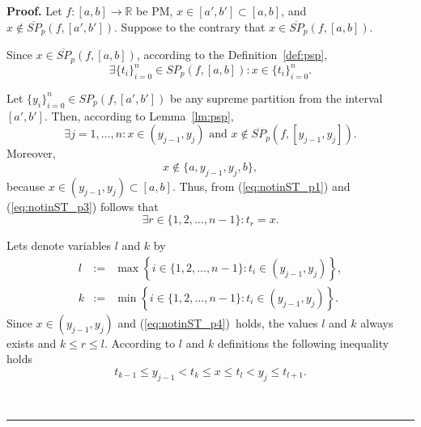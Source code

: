 \documentclass[12pt, a4paper]{article}
\newenvironment{proof}[1][Proof]{\noindent \textbf{#1.} }{\  \rule{0.5em}{0.5em}}
\numberwithin{equation}{section}
\begin{document}
\begin{proof}
  Let $f:[a,b] \rightarrow \mathbb{R}$ be PM,
  $x \in [a', b'] \subset [a,b]$, 
  and $ x \notin \overline{SP}_p(f, [a', b'])$.
  Suppose to the contrary that
  $x \in \overline{SP}_p(f, [a, b])$.
  
  Since $x \in \overline{SP}_p(f, [a, b])$,
  according to the Definition~\ref{def:psp},
  \begin{equation} \label{eq:notinST_p1} 
    \exists \{t_i\}_{i=0}^n \in SP_p(f, [a, b]): x \in \{t_i\}_{i=0}^n.
  \end{equation}     
  
  Let $\{y_i\}_{i=0}^n \in SP_p(f, [a', b'])$ be any 
  supreme partition from the interval $[a', b']$. 
  Then, according to Lemma~\ref{lm:psp}, 
  \begin{equation} \label{eq:notinST_p2} 
    \exists j=1,\dots,n: x \in (y_{j-1}, y_j) \text{ and } 
    x \notin \overline{SP}_p(f, [y_{j-1}, y_j]).
  \end{equation}     
  Moreover, 
  \begin{equation}\label{eq:notinST_p3} 
    x \notin \{a, y_{j-1}, y_j, b\},
  \end{equation} 
  because $x \in (y_{j-1}, y_j) \subset [a, b]$.  
  Thus, from (\ref{eq:notinST_p1}) and (\ref{eq:notinST_p3}) 
  follows that  
  \begin{equation}\label{eq:notinST_p4}
    \exists r \in \{1,2,\dots,n-1\} : t_r = x.
  \end{equation}  

  Lets denote variables $l$ and $k$ by
  \begin{eqnarray*}
    l &:=& \max \left\{i \in \{1,2,\dots,n-1\} : 
      t_i  \in (y_{j-1}, y_j) \right\}, \\
    k &:= &\min \left\{i \in \{1,2,\dots,n-1\} : 
      t_i  \in (y_{j-1}, y_j) \right\}.
  \end{eqnarray*}  
  Since $x \in (y_{j-1}, y_j)$ and (\ref{eq:notinST_p4})~holds, 
  the values $l$ and $k$ always exists and $k \leq r \leq l$. 
  According to $l$ and $k$ definitions the following inequality holds  
  \begin{equation}\label{eq:notinST_p5}
    t_{k-1} \leq y_{j-1} < t_{k} \leq x \leq t_{l} < y_j \leq t_{l+1}.
  \end{equation}
  

\end{proof}
\end{document}
